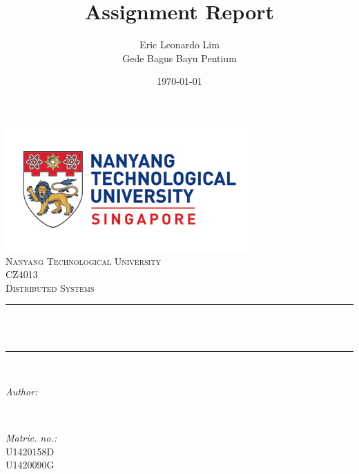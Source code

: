 \documentclass[12pt]{article}
\title{Assignment Report}								%
\author{Eric Leonardo Lim \\ Gede Bagus Bayu Pentium}	%
\date{\today}											%
\makeatletter
\let\thetitle\@title
\let\theauthor\@author
\let\thedate\@date
\makeatother
\begin{document}

\begin{titlepage}
	\centering
    \vspace*{0.5 cm}
    \includegraphics[scale = 2.7]{ntu.jpg}\\[1.0 cm]	%
    \textsc{\LARGE Nanyang Technological University}\\[2.0 cm]	%
	\textsc{\Large CZ4013}\\[0.5 cm]				%
	\textsc{\large Distributed Systems}\\[0.5 cm]				%
	\rule{\linewidth}{0.2 mm} \\[0.4 cm]
	{ \huge \bfseries \thetitle}\\
	\rule{\linewidth}{0.2 mm} \\[1.5 cm]
	
	\begin{minipage}{0.4\textwidth}
		\begin{flushleft} \large
			\emph{Author:}\\
			\theauthor
			\end{flushleft}
			\end{minipage}~
			\begin{minipage}{0.4\textwidth}
			\begin{flushright} \large
			\emph{Matric. no.:} \\
			U1420158D\\
            U1420090G%
		\end{flushright}
	\end{minipage}\\[2 cm]
	
	{\large \thedate}\\[2 cm]
 
	\vfill
	
\end{titlepage}

\end{document}
